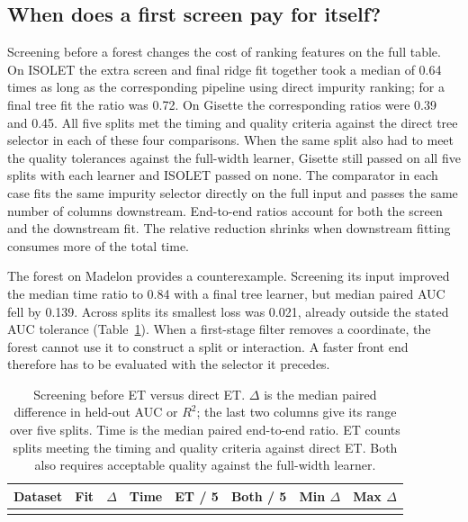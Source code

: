 \subsection{When does a first screen pay for itself?}
Screening before a forest changes the cost of ranking features on the full table. On ISOLET the extra screen and final ridge fit together took a median of 0.64 times as long as the corresponding pipeline using direct impurity ranking; for a final tree fit the ratio was 0.72. On Gisette the corresponding ratios were 0.39 and 0.45. All five splits met the timing and quality criteria against the direct tree selector in each of these four comparisons. When the same split also had to meet the quality tolerances against the full-width learner, Gisette still passed on all five splits with each learner and ISOLET passed on none. The comparator in each case fits the same impurity selector directly on the full input and passes the same number of columns downstream. End-to-end ratios account for both the screen and the downstream fit. The relative reduction shrinks when downstream fitting consumes more of the total time.

The forest on Madelon provides a counterexample. Screening its input improved the median time ratio to 0.84 with a final tree learner, but median paired AUC fell by 0.139. Across splits its smallest loss was 0.021, already outside the stated AUC tolerance (Table~\ref{tab:prefilter}). When a first-stage filter removes a coordinate, the forest cannot use it to construct a split or interaction. A faster front end therefore has to be evaluated with the selector it precedes.

\begin{table}[tbp]
\centering\small
\caption{Screening before ET versus direct ET. $\Delta$ is the median paired difference in held-out AUC or $R^2$; the last two columns give its range over five splits. Time is the median paired end-to-end ratio. ET counts splits meeting the timing and quality criteria against direct ET. Both also requires acceptable quality against the full-width learner.}
\label{tab:prefilter}
\setlength{\tabcolsep}{3pt}
\begin{tabular}{@{}llrrrrrr@{}}
\toprule Dataset & Fit & $\Delta$ & Time & ET / 5 & Both / 5 & Min $\Delta$ & Max $\Delta$\\
\midrule
\\
\bottomrule
\end{tabular}
\end{table}

